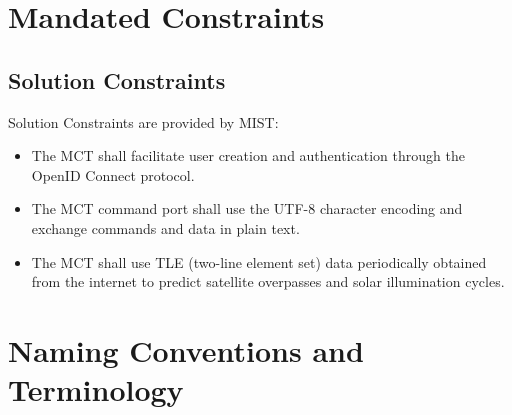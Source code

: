 \documentclass[12pt]{article}
\begin{document}
\section{Mandated Constraints}
\subsection{Solution Constraints}
Solution Constraints are provided by MIST:
\begin{itemize}
  \item The MCT shall facilitate user creation and authentication through the OpenID Connect protocol.
  \item The MCT command port shall use the UTF-8 character encoding and exchange commands and data in plain text.
  \item The MCT shall use TLE (two-line element set) data periodically obtained from the internet to predict satellite overpasses and solar illumination cycles.
\end{itemize}

\section{Naming Conventions and Terminology}
\end{document}
